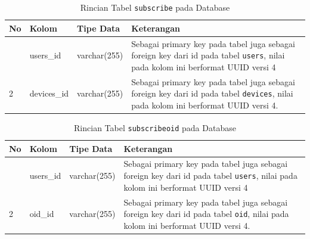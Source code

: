     	\begin{longtable}{|p{}|p{}|p{}|p{}|} %
    		
    		\caption{Rincian Tabel \texttt{subscribe} pada Database} \label{tabeldbsubscribe} \\
    		\hline
    		\textbf{No} & \textbf{Kolom} & \textbf{Tipe Data} & \textbf{Keterangan} \\ \hline
    		\endhead
    		\endfoot
    		\endlastfoot
    		1 & users\_id & varchar(255) & Sebagai primary key pada tabel juga sebagai foreign key dari id pada tabel \texttt{users}, nilai pada kolom ini berformat UUID versi 4 \\ \hline
    		2 & devices\_id & varchar(255) & Sebagai primary key pada tabel juga sebagai foreign key dari id pada tabel \texttt{devices}, nilai pada kolom ini berformat UUID versi 4. \\ \hline
    	\end{longtable}
    
    	\begin{longtable}{|p{}|p{}|p{}|p{}|} %
    		
    		\caption{Rincian Tabel \texttt{subscribeoid} pada Database} \label{tabeldbsubscribeoid} \\
    		\hline
    		\textbf{No} & \textbf{Kolom} & \textbf{Tipe Data} & \textbf{Keterangan} \\ \hline
    		\endhead
    		\endfoot
    		\endlastfoot
    		1 & users\_id & varchar(255) & Sebagai primary key pada tabel juga sebagai foreign key dari id pada tabel \texttt{users}, nilai pada kolom ini berformat UUID versi 4 \\ \hline
    		2 & oid\_id & varchar(255) & Sebagai primary key pada tabel juga sebagai foreign key dari id pada tabel \texttt{oid}, nilai pada kolom ini berformat UUID versi 4. \\ \hline
    	\end{longtable} 

